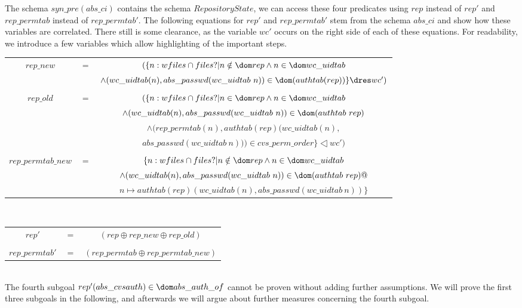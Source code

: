 The schema $syn\_pre(abs\_ci)$ contains the schema $RepositoryState$, we can access these four predicates using $rep$ instead of $rep'$ and $rep\_permtab$ instead of $rep\_permtab'$. The following equations for $rep'$ and $rep\_permtab'$ stem from the schema $abs\_ci$ and show how these variables are correlated. There still is some clearance, as the variable $wc'$ occurs on the right side of each of these equations. For readability, we introduce a few variables which allow highlighting of the important steps. \\[0,4cm]
%
%
\begin{tabular}{ccc}
  $rep\_new$ & $=$ & $(\{ n: wfiles \cap files? | n \notin \dom rep \land n \in
  \dom wc\_uidtab$ \\
  & & $\land (wc\_uidtab(n), abs\_passwd(wc\_uidtab~n)) \in
  \dom(authtab(rep))\} \dres wc')$\\
 & & \\
  $rep\_old$ & $=$ & $(\{n : wfiles \cap files? | n \in \dom rep \land n \in \dom
    wc\_uidtab $ \\
  & & $\land (wc\_uidtab(n), abs\_passwd(wc\_uidtab~n)) \in \dom(authtab~rep)$\\
  & & $\land (rep\_permtab(n),authtab(rep)(wc\_uidtab(n),$\\
  & & $abs\_passwd(wc\_uidtab~n)))\in cvs\_perm\_order\}
\dres wc')$\\
 & & \\
$rep\_permtab\_new$ & $=$ & $\{ n: wfiles \cap files? |  n \notin
    \dom rep \land n \in \dom wc\_uidtab$\\
 & & $\land (wc\_uidtab(n), abs\_passwd(wc\_uidtab~n)) \in \dom(authtab~rep) @$\\
 & & $n \mapsto authtab(rep)(wc\_uidtab(n), abs\_passwd(wc\_uidtab~n)) \}$\\

\end{tabular}\\[0.4cm]
\begin{tabular}{ccc}
 $rep'$ & $=$ & $(rep \oplus rep\_new \oplus rep\_old)$\\
 & & \\
 $rep\_permtab'$ & $=$ & $(rep\_permtab \oplus rep\_permtab\_new)$\\
\end{tabular}\\[0.4cm]
The fourth subgoal $rep'(abs\_cvsauth) \in \dom abs\_auth\_of$ cannot
be proven without adding further assumptions. We will prove the first
three subgoals in the following, and afterwards we will argue about
further measures concerning the fourth subgoal.
%
%
%
